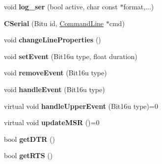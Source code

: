 \begin{DoxyCompactItemize}
\item 
\hypertarget{classCSerial_a4594f795967edcfcc7dc6baf65e86471}{void {\bfseries log\-\_\-ser} (bool active, char const $\ast$format,...)}\label{classCSerial_a4594f795967edcfcc7dc6baf65e86471}

\item 
\hypertarget{classCSerial_a0d6645918fcd02f8ebee1e19b84502d3}{{\bfseries C\-Serial} (Bitu id, \hyperlink{classCommandLine}{Command\-Line} $\ast$cmd)}\label{classCSerial_a0d6645918fcd02f8ebee1e19b84502d3}

\item 
\hypertarget{classCSerial_a45792d7c305b1ebf2f77cc2a239425a5}{void {\bfseries change\-Line\-Properties} ()}\label{classCSerial_a45792d7c305b1ebf2f77cc2a239425a5}

\item 
\hypertarget{classCSerial_a67c9186270470250c91dcdcc3aaea11c}{void {\bfseries set\-Event} (Bit16u type, float duration)}\label{classCSerial_a67c9186270470250c91dcdcc3aaea11c}

\item 
\hypertarget{classCSerial_aca294ec9e6b8c101db31961682e8b611}{void {\bfseries remove\-Event} (Bit16u type)}\label{classCSerial_aca294ec9e6b8c101db31961682e8b611}

\item 
\hypertarget{classCSerial_ab14fff646607c1558e662be1807d310d}{void {\bfseries handle\-Event} (Bit16u type)}\label{classCSerial_ab14fff646607c1558e662be1807d310d}

\item 
\hypertarget{classCSerial_a9eb8589001331e808b9a66cc7858af35}{virtual void {\bfseries handle\-Upper\-Event} (Bit16u type)=0}\label{classCSerial_a9eb8589001331e808b9a66cc7858af35}

\item 
\hypertarget{classCSerial_adf592be677f4e36575fb3b807a371fb5}{virtual void {\bfseries update\-M\-S\-R} ()=0}\label{classCSerial_adf592be677f4e36575fb3b807a371fb5}

\item 
\hypertarget{classCSerial_a50dce09f07593bc4f45cd48571423750}{bool {\bfseries get\-D\-T\-R} ()}\label{classCSerial_a50dce09f07593bc4f45cd48571423750}

\item 
\hypertarget{classCSerial_a79eb1affc7b7f699dc7329c0c4566436}{bool {\bfseries get\-R\-T\-S} ()}\label{classCSerial_a79eb1affc7b7f699dc7329c0c4566436}


\end{DoxyCompactItemize}
